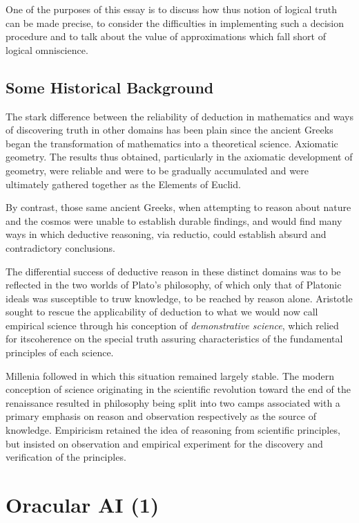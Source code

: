 \documentclass[10pt,titlepage]{book}
\begin{document}
One of the purposes of this essay is to discuss how thus notion of logical truth can be made precise, to consider the difficulties in implementing such a decision procedure and to talk about the value of approximations which fall short of logical omniscience.

\section{Some Historical Background}

The stark difference between the reliability of deduction in mathematics and ways of discovering truth in other domains has been plain since the ancient Greeks began the transformation of mathematics into a theoretical science.
Axiomatic geometry.
The results thus obtained, particularly in the axiomatic development of geometry, were reliable and were to be gradually accumulated and were ultimately gathered together as the Elements of Euclid.

By contrast, those same ancient Greeks, when attempting to reason about nature and the cosmos were unable to establish durable findings, and would find many ways in which deductive reasoning, via reductio, could establish absurd and contradictory conclusions.

The differential success of deductive reason in these distinct domains was to be reflected in the two worlds of Plato's philosophy, of which only that of Platonic ideals was susceptible to truw knowledge, to be reached by reason alone.
Aristotle sought to rescue the applicability of deduction to what we would now call empirical science through his conception of \emph{demonstrative science}, which relied for itscoherence on the special truth assuring characteristics of the fundamental principles of each science.

Millenia followed in which this situation remained largely stable.
The modern conception of science originating in the scientific revolution toward the end of the renaissance resulted in philosophy being split into two camps associated with a primary emphasis on reason and observation respectively as the source of knowledge.
Empiricism retained the idea of reasoning from scientific principles, but insisted on observation and empirical experiment for the discovery and verification of the principles.


\chapter{Oracular AI (1)}
\end{document}
